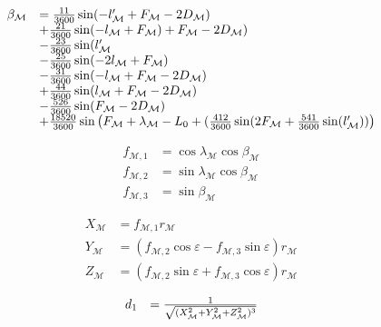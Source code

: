 \documentclass{article}
\begin{document}
\begin{equation}
\begin{array}{ll}
\beta_{{\mathcal M}} &= {11\over 3600} \sin(-l'_{\mathcal M} + F_{\mathcal M} - 2D_{\mathcal M})\\
&+ {21\over 3600} \sin(-l_{\mathcal M} + F_{\mathcal M})+ F_{\mathcal M} - 2D_{\mathcal M})\\
&- {23\over 3600} \sin(l'_{\mathcal M} \\
&- {25\over 3600} \sin(-2l_{{\mathcal M}} + F_{\mathcal M})\\
&- {31\over 3600} \sin(-l_{{\mathcal M}} + F_{{\mathcal M}} - 2D_{{\mathcal M}})\\
&+ {44\over 3600} \sin(l_{{\mathcal M}} + F_{{\mathcal M}} - 2D_{{\mathcal M}}) \\
&- {526\over 3600} \sin(F_{{\mathcal M}} - 2D_{{\mathcal M}})\\
&+ {18520\over 3600} \sin\left(F_{{\mathcal M}} + \lambda_{{\mathcal M}}-L_0 + ( {412\over 3600} \sin(2F_{{\mathcal M}} + {541\over 3600} \sin(l'_{{\mathcal M}})) \right)\\
\end{array}
\end{equation}

\begin{equation}
\begin{array}{ll}
f_{\mathcal M,1} &= \cos{\lambda_{\mathcal M}}\cos{\beta_{\mathcal M}} \\
f_{\mathcal M,2} &= \sin{\lambda_{\mathcal M}}\cos{\beta_{\mathcal M}} \\
f_{\mathcal M,3} &= \sin{\beta_{\mathcal M}}
\end{array}
\end{equation}

\begin{equation}
\begin{array}{ll}
X_{\mathcal M} &= f_{\mathcal M,1}r_{\mathcal M} \\
Y_{\mathcal M} &= (f_{\mathcal M,2}\cos\varepsilon - f_{\mathcal M,3}\sin\varepsilon)r_{\mathcal M} \\
Z_{\mathcal M} &= (f_{\mathcal M,2}\sin\varepsilon + f_{\mathcal M,3}\cos\varepsilon)r_{\mathcal M}
\end{array}
\end{equation}

\begin{equation}
\begin{array}{ll}
d_1 &= {1 \over \sqrt{(X_\mathcal M^2+Y_\mathcal M^2+Z_\mathcal M^2)^3}}
\end{array}
\end{equation}
\end{document}
